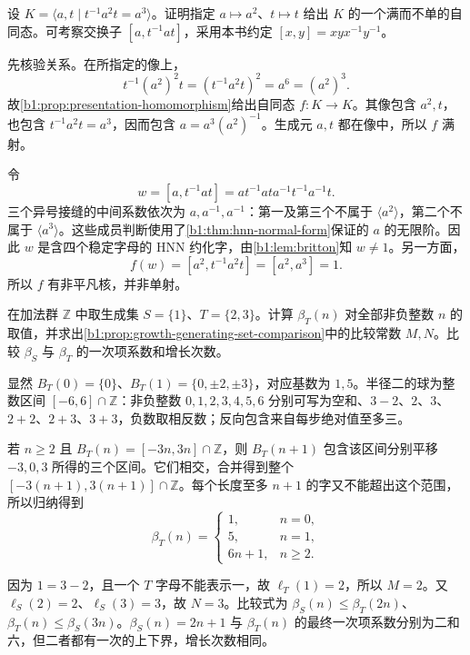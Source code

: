 \begin{exercise}\label{b1:ex:C-hnn-surjective-endomorphism}
	设 \(K=\langle a,t\mid t^{-1}a^2t=a^3\rangle\)。证明指定 \(a\mapsto a^2\)、\(t\mapsto t\) 给出 \(K\) 的一个满而不单的自同态。可考察交换子 \([a,t^{-1}at]\)，采用本书约定 \([x,y]=xyx^{-1}y^{-1}\)。
\end{exercise}
\begin{solution}
	先核验关系。在所指定的像上，
	\[
		t^{-1}(a^2)^2t=(t^{-1}a^2t)^2=a^6=(a^2)^3.
	\]
	故\cref{b1:prop:presentation-homomorphism}给出自同态 \(f:K\rightarrow K\)。其像包含 \(a^2,t\)，也包含 \(t^{-1}a^2t=a^3\)，因而包含 \(a=a^3(a^2)^{-1}\)。生成元 \(a,t\) 都在像中，所以 \(f\) 满射。

	令
	\[
		w=[a,t^{-1}at]=at^{-1}at a^{-1}t^{-1}a^{-1}t.
	\]
	三个异号接缝的中间系数依次为 \(a,a^{-1},a^{-1}\)：第一及第三个不属于 \(\langle a^2\rangle\)，第二个不属于 \(\langle a^3\rangle\)。这些成员判断使用了\cref{b1:thm:hnn-normal-form}保证的 \(a\) 的无限阶。因此 \(w\) 是含四个稳定字母的 HNN 约化字，由\cref{b1:lem:britton}知 \(w\ne1\)。另一方面，
	\[
		f(w)=[a^2,t^{-1}a^2t]=[a^2,a^3]=1.
	\]
	所以 \(f\) 有非平凡核，并非单射。
\end{solution}

\begin{exercise}\label{b1:ex:C-growth-integer-generators}
	在加法群 \(\mathbb Z\) 中取生成集 \(S=\{1\}\)、\(T=\{2,3\}\)。计算 \(\beta_T(n)\) 对全部非负整数 \(n\) 的取值，并求出\cref{b1:prop:growth-generating-set-comparison}中的比较常数 \(M,N\)。比较 \(\beta_S\) 与 \(\beta_T\) 的一次项系数和增长次数。
\end{exercise}
\begin{solution}
	显然 \(B_T(0)=\{0\}\)、\(B_T(1)=\{0,\pm2,\pm3\}\)，对应基数为 \(1,5\)。半径二的球为整数区间 \([-6,6]\cap\mathbb Z\)：非负整数 \(0,1,2,3,4,5,6\) 分别可写为空和、\(3-2\)、\(2\)、\(3\)、\(2+2\)、\(2+3\)、\(3+3\)，负数取相反数；反向包含来自每步绝对值至多三。

	若 \(n\ge2\) 且 \(B_T(n)=[-3n,3n]\cap\mathbb Z\)，则 \(B_T(n+1)\) 包含该区间分别平移 \(-3,0,3\) 所得的三个区间。它们相交，合并得到整个 \([-3(n+1),3(n+1)]\cap\mathbb Z\)。每个长度至多 \(n+1\) 的字又不能超出这个范围，所以归纳得到
	\[
		\beta_T(n)=
		\begin{cases}
			1,&n=0,\\
			5,&n=1,\\
			6n+1,&n\ge2.
		\end{cases}
	\]

	因为 \(1=3-2\)，且一个 \(T\) 字母不能表示一，故 \(\ell_T(1)=2\)，所以 \(M=2\)。又 \(\ell_S(2)=2\)、\(\ell_S(3)=3\)，故 \(N=3\)。比较式为 \(\beta_S(n)\le\beta_T(2n)\)、\(\beta_T(n)\le\beta_S(3n)\)。\(\beta_S(n)=2n+1\) 与 \(\beta_T(n)\) 的最终一次项系数分别为二和六，但二者都有一次的上下界，增长次数相同。
\end{solution}

